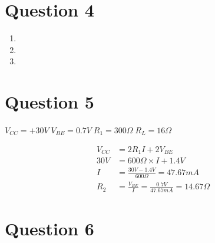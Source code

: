 \documentclass[11pt]{article}
\begin{document}
\section*{Question 4}
  \begin{enumerate}[label=\roman*)]
    \item %
    \item %
    \item %
  \end{enumerate}

\section*{Question 5}
  $V_{CC} = +30V \; V_{BE} = 0.7V \; R_{1} = 300\Omega \; R_L = 16\Omega$\
  
  \begin{align*}
    V_{CC} &= 2R_{1}I + 2V_{BE} \\
    30V &= 600\Omega \times I + 1.4V \\
    I &= \frac{30V-1.4V}{600\Omega} = 47.67mA \\
    R_{2} &= \frac{V_{BE}}{I} = \frac{0.7V}{47.67mA} = 14.67\Omega 
  \end{align*}

\section*{Question 6}
\end{document}
